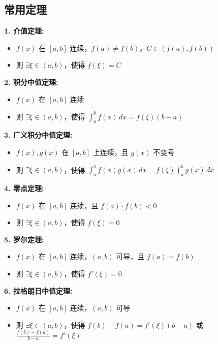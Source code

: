 \documentclass[10pt]{article}
\begin{document}
\newpage
\begin{multicols*}{2}
\raggedcolumns

\section*{常用定理}

\textbf{1. 介值定理:}
\begin{itemize}
  \item \(f(x)\) 在 \([a, b]\) 连续，\(f(a) \neq f(b)\)，\(C \in (f(a), f(b))\)
  \item 则 \(\exists \xi \in (a, b)\)，使得 \(f(\xi) = C\)
\end{itemize}

\textbf{2. 积分中值定理:}
\begin{itemize}
  \item \(f(x)\) 在 \([a, b]\) 连续
  \item 则 \(\exists \xi \in (a, b)\)，使得 \(\int_a^b f(x) \, dx = f(\xi)(b - a)\)
\end{itemize}

\textbf{3. 广义积分中值定理:}
\begin{itemize}
  \item \(f(x), g(x)\) 在 \([a, b]\) 上连续，且 \(g(x)\) 不变号
  \item 则 \(\exists \xi \in (a, b)\)，使得 \(\int_a^b f(x)g(x) \, dx = f(\xi) \int_a^b g(x) \, dx\)
\end{itemize}

\textbf{4. 零点定理:}
\begin{itemize}
  \item \(f(x)\) 在 \([a, b]\) 连续，且 \(f(a) \cdot f(b) < 0\)
  \item 则 \(\exists \xi \in (a, b)\)，使得 \(f(\xi) = 0\)
\end{itemize}

\textbf{5. 罗尔定理:}
\begin{itemize}
  \item \(f(x)\) 在 \([a, b]\) 连续，\((a, b)\) 可导，且 \(f(a) = f(b)\)
  \item 则 \(\exists \xi \in (a, b)\)，使得 \(f'(\xi) = 0\)
\end{itemize}

\textbf{6. 拉格朗日中值定理:}
\begin{itemize}
  \item \(f(x)\) 在 \([a, b]\) 连续，\((a, b)\) 可导
  \item 则 \(\exists \xi \in (a, b)\)，使得 \(f(b) - f(a) = f'(\xi)(b - a)\) 或 \(\frac{f(b) - f(a)}{b - a} = f'(\xi)\)
\end{itemize}


\end{multicols*}
\end{document}
